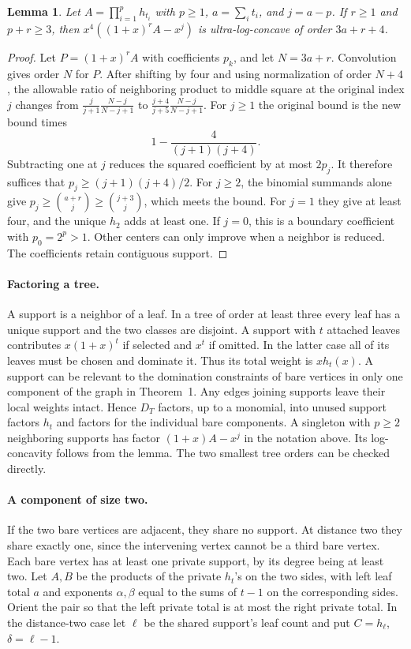 \documentclass[10pt]{article}
\newtheorem{lemma}[theorem]{Lemma}
\begin{document}
\begin{lemma}
Let \(A=\prod_{i=1}^p h_{t_i}\) with \(p\ge1\),
\(a=\sum_i t_i\), and \(j=a-p\). If \(r\ge1\) and \(p+r\ge3\), then
\(x^4((1+x)^r A-x^j)\) is ultra-log-concave of order \(3a+r+4\).
\end{lemma}

\begin{proof}
Let \(P=(1+x)^r A\) with coefficients \(p_k\), and let \(N=3a+r\).
Convolution gives order \(N\) for \(P\). After shifting by four and
using normalization of order \(N+4\), the allowable ratio of
neighboring product to middle square at the original index \(j\)
changes from
\(\frac{j}{j+1}\frac{N-j}{N-j+1}\) to
\(\frac{j+4}{j+5}\frac{N-j}{N-j+1}\).
For \(j\ge1\) the original bound is the new bound times
\[
1-\frac{4}{(j+1)(j+4)}.
\]
Subtracting one at \(j\) reduces the squared coefficient by at
most \(2p_j\). It therefore suffices that \(p_j\ge(j+1)(j+4)/2\).
For \(j\ge2\), the binomial summands alone give
\(p_j\ge\binom{a+r}{j}\ge\binom{j+3}{j}\), which meets the bound.
For \(j=1\) they give at least four, and the unique \(h_2\) adds
at least one. If \(j=0\), this is a boundary coefficient with
\(p_0=2^p>1\). Other centers can only improve when a neighbor is
reduced. The coefficients retain contiguous support.
\end{proof}

\paragraph{Factoring a tree.}
A support is a neighbor of a leaf. In a tree of order at least
three every leaf has a unique support and the two classes are disjoint.
A support with \(t\) attached leaves contributes \(x(1+x)^t\) if
selected and \(x^t\) if omitted. In the latter case all of its
leaves must be chosen and dominate it. Thus its total weight is
\(xh_t(x)\). A support can be relevant to the domination constraints
of bare vertices in only one component of the graph in Theorem~1.
Any edges joining supports leave their local weights intact.
Hence \(D_T\) factors, up to a monomial, into unused support
factors \(h_t\) and factors for the individual bare components.
A singleton with \(p\ge2\) neighboring supports has factor
\((1+x)A-x^j\) in the notation above. Its log-concavity follows
from the lemma. The two smallest tree orders can be checked directly.

\paragraph{A component of size two.}
If the two bare vertices are adjacent, they share no support.
At distance two they share exactly one, since the intervening
vertex cannot be a third bare vertex. Each bare vertex has
at least one private support, by its degree being at least two.
Let \(A,B\) be the products of the private \(h_t\)'s on the two
sides, with left leaf total \(a\) and exponents \(\alpha,\beta\)
equal to the sums of \(t-1\) on the corresponding sides.
Orient the pair so that the left private total is at most the
right private total. In the distance-two case let \(\ell\) be
the shared support's leaf count and put \(C=h_\ell\), \(\delta=\ell-1\).
\end{document}
